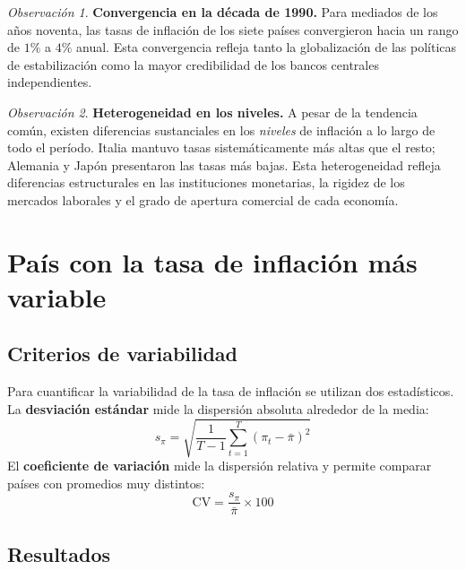 \documentclass[12pt, letterpaper]{article}
\theoremstyle{remark}
\newtheorem{obs}{Observaci\'on}
\begin{document}
\begin{obs}
  \textbf{Convergencia en la d\'ecada de 1990.} Para mediados de los a\~nos
  noventa, las tasas de inflaci\'on de los siete pa\'ises convergieron hacia
  un rango de $1\%$ a $4\%$ anual. Esta convergencia refleja tanto la
  globalizaci\'on de las pol\'iticas de estabilizaci\'on como la mayor
  credibilidad de los bancos centrales independientes.
\end{obs}

\begin{obs}
  \textbf{Heterogeneidad en los niveles.} A pesar de la tendencia com\'un,
  existen diferencias sustanciales en los \emph{niveles} de inflaci\'on a lo
  largo de todo el per\'iodo. Italia mantuvo tasas sistem\'aticamente m\'as
  altas que el resto; Alemania y Jap\'on presentaron las tasas m\'as bajas.
  Esta heterogeneidad refleja diferencias estructurales en las instituciones
  monetarias, la rigidez de los mercados laborales y el grado de apertura
  comercial de cada econom\'ia.
\end{obs}

\section{Pa\'is con la tasa de inflaci\'on m\'as variable}

\subsection{Criterios de variabilidad}

Para cuantificar la variabilidad de la tasa de inflaci\'on se utilizan dos
estad\'isticos. La \textbf{desviaci\'on est\'andar} mide la dispersi\'on
absoluta alrededor de la media:
\begin{equation}
  s_\pi = \sqrt{\frac{1}{T-1}\sum_{t=1}^{T}(\pi_t - \bar\pi)^2}
  \label{eq:std}
\end{equation}
El \textbf{coeficiente de variaci\'on} mide la dispersi\'on relativa y
permite comparar pa\'ises con promedios muy distintos:
\begin{equation}
  \text{CV} = \frac{s_\pi}{\bar\pi} \times 100
  \label{eq:cv}
\end{equation}

\subsection{Resultados}
\end{document}
